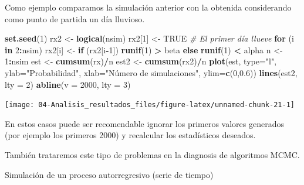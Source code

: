 \documentclass[]{book}
\newenvironment{Shaded}{\begin{snugshade}}{\end{snugshade}}
\newcommand{\KeywordTok}[1]{\textcolor[rgb]{0.13,0.29,0.53}{\textbf{#1}}}
\newcommand{\DataTypeTok}[1]{\textcolor[rgb]{0.13,0.29,0.53}{#1}}
\newcommand{\DecValTok}[1]{\textcolor[rgb]{0.00,0.00,0.81}{#1}}
\newcommand{\FloatTok}[1]{\textcolor[rgb]{0.00,0.00,0.81}{#1}}
\newcommand{\StringTok}[1]{\textcolor[rgb]{0.31,0.60,0.02}{#1}}
\newcommand{\CommentTok}[1]{\textcolor[rgb]{0.56,0.35,0.01}{\textit{#1}}}
\newcommand{\OtherTok}[1]{\textcolor[rgb]{0.56,0.35,0.01}{#1}}
\newcommand{\ControlFlowTok}[1]{\textcolor[rgb]{0.13,0.29,0.53}{\textbf{#1}}}
\newcommand{\OperatorTok}[1]{\textcolor[rgb]{0.81,0.36,0.00}{\textbf{#1}}}
\newcommand{\NormalTok}[1]{#1}
\theoremstyle{definition}
\theoremstyle{definition}
\theoremstyle{definition}
\theoremstyle{remark}
\let\BeginKnitrBlock\begin \let\EndKnitrBlock\end
\begin{document}
Como ejemplo comparamos la simulación anterior con la obtenida
considerando como punto de partida un día lluvioso.

\begin{Shaded}
\begin{Highlighting}[]
\KeywordTok{set.seed}\NormalTok{(}\DecValTok{1}\NormalTok{)}
\NormalTok{rx2 <-}\StringTok{ }\KeywordTok{logical}\NormalTok{(nsim)}
\NormalTok{rx2[}\DecValTok{1}\NormalTok{] <-}\StringTok{ }\OtherTok{TRUE} \CommentTok{# El primer día llueve}
\ControlFlowTok{for}\NormalTok{ (i }\ControlFlowTok{in} \DecValTok{2}\OperatorTok{:}\NormalTok{nsim)}
\NormalTok{  rx2[i] <-}\StringTok{ }\ControlFlowTok{if}\NormalTok{ (rx2[i}\OperatorTok{-}\DecValTok{1}\NormalTok{]) }\KeywordTok{runif}\NormalTok{(}\DecValTok{1}\NormalTok{) }\OperatorTok{>}\StringTok{ }\NormalTok{beta }\ControlFlowTok{else} \KeywordTok{runif}\NormalTok{(}\DecValTok{1}\NormalTok{) }\OperatorTok{<}\StringTok{ }\NormalTok{alpha}
\NormalTok{n <-}\StringTok{ }\DecValTok{1}\OperatorTok{:}\NormalTok{nsim}
\NormalTok{est <-}\StringTok{ }\KeywordTok{cumsum}\NormalTok{(rx)}\OperatorTok{/}\NormalTok{n}
\NormalTok{est2 <-}\StringTok{ }\KeywordTok{cumsum}\NormalTok{(rx2)}\OperatorTok{/}\NormalTok{n}
\KeywordTok{plot}\NormalTok{(est, }\DataTypeTok{type=}\StringTok{"l"}\NormalTok{, }\DataTypeTok{ylab=}\StringTok{"Probabilidad"}\NormalTok{, }
     \DataTypeTok{xlab=}\StringTok{"Número de simulaciones"}\NormalTok{, }\DataTypeTok{ylim=}\KeywordTok{c}\NormalTok{(}\DecValTok{0}\NormalTok{,}\FloatTok{0.6}\NormalTok{))}
\KeywordTok{lines}\NormalTok{(est2, }\DataTypeTok{lty =} \DecValTok{2}\NormalTok{)}
\KeywordTok{abline}\NormalTok{(}\DataTypeTok{v =} \DecValTok{2000}\NormalTok{, }\DataTypeTok{lty =} \DecValTok{3}\NormalTok{)}
\end{Highlighting}
\end{Shaded}

\begin{center}\texttt{[image: 04-Analisis\_resultados\_files/figure-latex/unnamed-chunk-21-1]} \end{center}

En estos casos puede ser recomendable ignorar los primeros valores
generados (por ejemplo los primeros 2000) y recalcular los estadísticos
deseados.

También trataremos este tipo de problemas en la diagnosis de algoritmos
MCMC.

\BeginKnitrBlock{example}
\protect\hypertarget{exm:unnamed-chunk-22}{}{\label{exm:unnamed-chunk-22}
}Simulación de un proceso autorregresivo (serie de tiempo)
\EndKnitrBlock{example}
\end{document}
